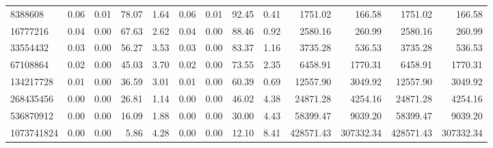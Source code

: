 \begin{tabular}{lrrrrrrrrrrrr}
8388608 & 0.06 & 0.01 & 78.07 & 1.64 & 0.06 & 0.01 & 92.45 & 0.41 & 1751.02 & 166.58 & 1751.02 & 166.58 \\
16777216 & 0.04 & 0.00 & 67.63 & 2.62 & 0.04 & 0.00 & 88.46 & 0.92 & 2580.16 & 260.99 & 2580.16 & 260.99 \\
33554432 & 0.03 & 0.00 & 56.27 & 3.53 & 0.03 & 0.00 & 83.37 & 1.16 & 3735.28 & 536.53 & 3735.28 & 536.53 \\
67108864 & 0.02 & 0.00 & 45.03 & 3.70 & 0.02 & 0.00 & 73.55 & 2.35 & 6458.91 & 1770.31 & 6458.91 & 1770.31 \\
134217728 & 0.01 & 0.00 & 36.59 & 3.01 & 0.01 & 0.00 & 60.39 & 0.69 & 12557.90 & 3049.92 & 12557.90 & 3049.92 \\
268435456 & 0.00 & 0.00 & 26.81 & 1.14 & 0.00 & 0.00 & 46.02 & 4.38 & 24871.28 & 4254.16 & 24871.28 & 4254.16 \\
536870912 & 0.00 & 0.00 & 16.09 & 1.88 & 0.00 & 0.00 & 30.00 & 4.43 & 58399.47 & 9039.20 & 58399.47 & 9039.20 \\
1073741824 & 0.00 & 0.00 & 5.86 & 4.28 & 0.00 & 0.00 & 12.10 & 8.41 & 428571.43 & 307332.34 & 428571.43 & 307332.34 \\
\bottomrule
\end{tabular}
